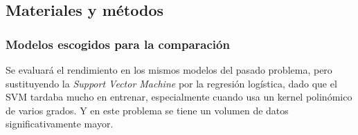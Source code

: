 
\subsection{Materiales y métodos}

\subsubsection{Modelos escogidos para la comparación}

Se evaluará el rendimiento en los mismos modelos del pasado problema, pero sustituyendo la \textit{Support Vector Machine} por la regresión logística, dado que el SVM tardaba mucho en entrenar, especialmente cuando usa un kernel polinómico de varios grados. Y en este problema se tiene un volumen de datos significativamente mayor. 

